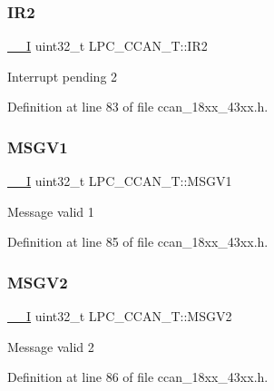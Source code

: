 \subsubsection{\texorpdfstring{I\+R2}{IR2}}
{\footnotesize\ttfamily \hyperlink{core__sc300_8h_af63697ed9952cc71e1225efe205f6cd3}{\+\_\+\+\_\+I} uint32\+\_\+t L\+P\+C\+\_\+\+C\+C\+A\+N\+\_\+\+T\+::\+I\+R2}

Interrupt pending 2 

Definition at line 83 of file ccan\+\_\+18xx\+\_\+43xx.\+h.

\mbox{\label{struct_l_p_c___c_c_a_n___t_a9b7b7649c8eb8b3761ab1e29ef5fc67a}} 
\subsubsection{\texorpdfstring{M\+S\+G\+V1}{MSGV1}}
{\footnotesize\ttfamily \hyperlink{core__sc300_8h_af63697ed9952cc71e1225efe205f6cd3}{\+\_\+\+\_\+I} uint32\+\_\+t L\+P\+C\+\_\+\+C\+C\+A\+N\+\_\+\+T\+::\+M\+S\+G\+V1}

Message valid 1 

Definition at line 85 of file ccan\+\_\+18xx\+\_\+43xx.\+h.

\mbox{\label{struct_l_p_c___c_c_a_n___t_a27ad4f6066a952a13e4e5abd09723623}} 
\subsubsection{\texorpdfstring{M\+S\+G\+V2}{MSGV2}}
{\footnotesize\ttfamily \hyperlink{core__sc300_8h_af63697ed9952cc71e1225efe205f6cd3}{\+\_\+\+\_\+I} uint32\+\_\+t L\+P\+C\+\_\+\+C\+C\+A\+N\+\_\+\+T\+::\+M\+S\+G\+V2}

Message valid 2 

Definition at line 86 of file ccan\+\_\+18xx\+\_\+43xx.\+h.

\mbox{\label{struct_l_p_c___c_c_a_n___t_a977d2e0f1c86a621b3ec89bce604c693}} 
